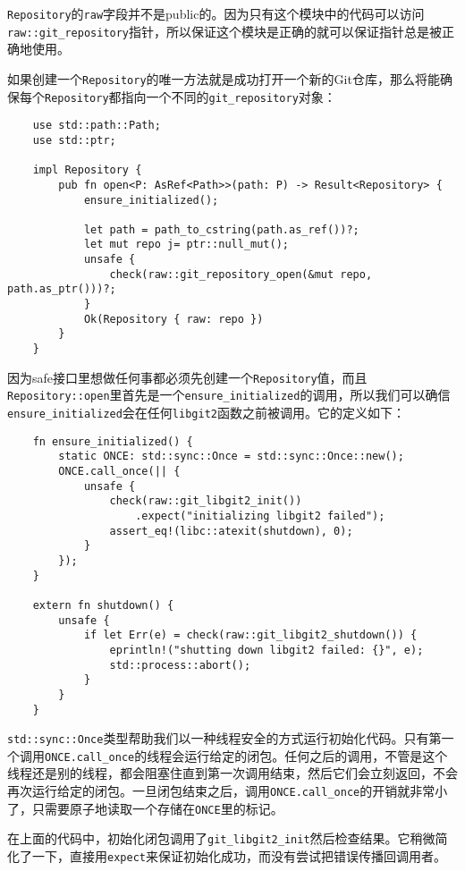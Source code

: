 \texttt{Repository}的\texttt{raw}字段并不是public的。因为只有这个模块中的代码可以访问\texttt{raw::git\_repository}指针，所以保证这个模块是正确的就可以保证指针总是被正确地使用。

如果创建一个\texttt{Repository}的唯一方法就是成功打开一个新的Git仓库，那么将能确保每个\texttt{Repository}都指向一个不同的\texttt{git\_repository}对象：
\begin{verbatim}
    use std::path::Path;
    use std::ptr;

    impl Repository {
        pub fn open<P: AsRef<Path>>(path: P) -> Result<Repository> {
            ensure_initialized();

            let path = path_to_cstring(path.as_ref())?;
            let mut repo j= ptr::null_mut();
            unsafe {
                check(raw::git_repository_open(&mut repo, path.as_ptr()))?;
            }
            Ok(Repository { raw: repo })
        }
    }
\end{verbatim}

因为safe接口里想做任何事都必须先创建一个\texttt{Repository}值，而且\texttt{Repository::open}里首先是一个\texttt{ensure\_initialized}的调用，所以我们可以确信\texttt{ensure\_initialized}会在任何\texttt{libgit2}函数之前被调用。它的定义如下：
\begin{verbatim}
    fn ensure_initialized() {
        static ONCE: std::sync::Once = std::sync::Once::new();
        ONCE.call_once(|| {
            unsafe {
                check(raw::git_libgit2_init())
                    .expect("initializing libgit2 failed");
                assert_eq!(libc::atexit(shutdown), 0);
            }
        });
    }

    extern fn shutdown() {
        unsafe {
            if let Err(e) = check(raw::git_libgit2_shutdown()) {
                eprintln!("shutting down libgit2 failed: {}", e);
                std::process::abort();
            }
        }
    }
\end{verbatim}

\texttt{std::sync::Once}类型帮助我们以一种线程安全的方式运行初始化代码。只有第一个调用\texttt{ONCE.call\_once}的线程会运行给定的闭包。任何之后的调用，不管是这个线程还是别的线程，都会阻塞住直到第一次调用结束，然后它们会立刻返回，不会再次运行给定的闭包。一旦闭包结束之后，调用\texttt{ONCE.call\_once}的开销就非常小了，只需要原子地读取一个存储在\texttt{ONCE}里的标记。

在上面的代码中，初始化闭包调用了\texttt{git\_libgit2\_init}然后检查结果。它稍微简化了一下，直接用\texttt{expect}来保证初始化成功，而没有尝试把错误传播回调用者。


